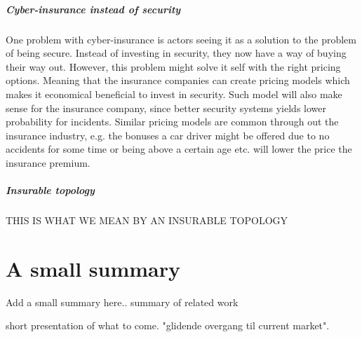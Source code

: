 \subparagraph{Cyber-insurance instead of security}
One problem with cyber-insurance is actors seeing it as a solution to the problem of being secure. Instead of investing in security, they now have a way of buying their way out. 
However, this problem might solve it self with the right pricing options. Meaning that the insurance companies can create pricing models which makes it economical beneficial to invest in security. Such model will also make sense for the insurance company, since better security systems yields lower probability for incidents.
Similar pricing models are common through out the insurance industry, e.g. the bonuses a car driver might be offered due to no accidents for some time or being above a certain age etc. will lower the price the insurance premium.  

\subparagraph{Insurable topology}
THIS IS WHAT WE MEAN BY AN INSURABLE TOPOLOGY 


\section{A small summary}
Add a small summary here..
summary of related work  

short presentation of what to come. "glidende overgang til current market".






